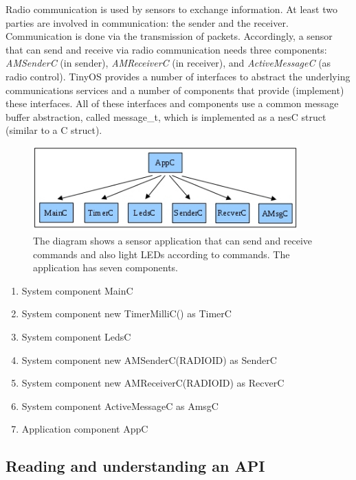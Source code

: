 \documentclass[letterpaper,12pt]{article}
\begin{document}
    Radio communication is used by sensors to exchange information. At least two parties are
    involved in communication: the sender and the receiver. Communication is done via
    the transmission of packets. Accordingly, a sensor that can send and receive via radio
    communication needs three components: \emph{AMSenderC} (in sender), \emph{AMReceiverC} (in receiver),
    and \emph{ActiveMessageC} (as radio control). TinyOS provides a number of interfaces
    to abstract the underlying communications services and a number of components that
    provide (implement) these interfaces. All of these interfaces and components use a
    common message buffer abstraction, called message\_t, which is implemented as a nesC
    struct (similar to a C struct).
    \begin{figure}[!hb]
        \centering
        \includegraphics[width=4in]{tinyos-diagram.jpg}
       \caption*{The diagram shows a sensor application that can send and receive commands and also light LEDs according to commands. The application has seven components.}
    \end{figure}
    \begin{enumerate}
        \item System component MainC
        \item System component new TimerMilliC() as TimerC
        \item System component LedsC
        \item System component new AMSenderC(RADIOID) as SenderC
        \item System component new AMReceiverC(RADIOID) as RecverC
        \item System component ActiveMessageC as AmsgC
        \item Application component AppC
    \end{enumerate}
\subsection*{Reading and understanding an API}
\end{document}

